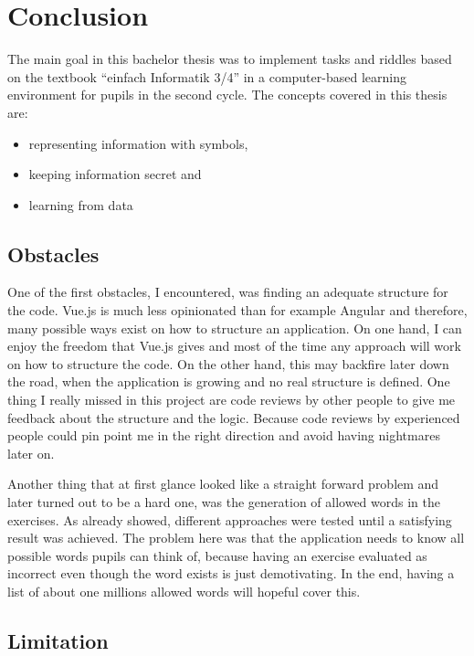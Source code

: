 \chapter{Conclusion}
\label{chapter:conclusion}

The main goal in this bachelor thesis was to implement tasks and riddles based on the textbook “einfach Informatik 3/4” in a computer-based learning environment for pupils in the second cycle. The concepts covered in this thesis are:

\begin{itemize}
    \item representing information with symbols,
    \item keeping information secret and
    \item learning from data
\end{itemize}

\section{Obstacles}
\label{section:obstacles}

One of the first obstacles, I encountered, was finding an adequate structure for the code. Vue.js is much less opinionated than for example Angular and therefore, many possible ways exist on how to structure an application. On one hand, I can enjoy the freedom that Vue.js gives and most of the time any approach will work on how to structure the code. On the other hand, this may backfire later down the road, when the application is growing and no real structure is defined. One thing I really missed in this project are code reviews by other people to give me feedback about the structure and the logic. Because code reviews by experienced people could pin point me in the right direction and avoid having nightmares later on.

Another thing that at first glance looked like a straight forward problem and later turned out to be a hard one, was the generation of allowed words in the  exercises. As already showed, different approaches were tested until a satisfying result was achieved. The problem here was that the application needs to know all possible words pupils can think of, because having an exercise evaluated as incorrect even though the word exists is just demotivating. In the end, having a list of about one millions allowed words will hopeful cover this.

\section{Limitation}
\label{section:limitation}


